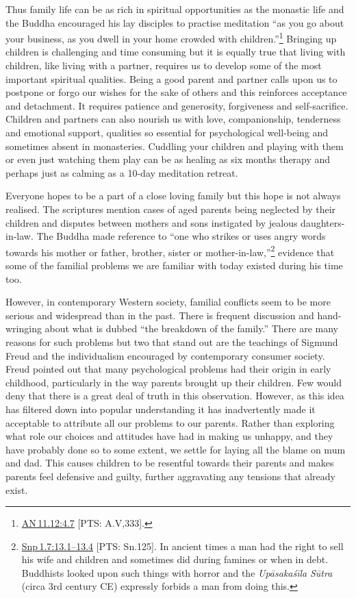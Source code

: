 \documentclass[10pt, openright]{book}
\begin{document}
Thus family life can be as rich in spiritual opportunities as the monastic life and the Buddha encouraged his lay disciples to practise meditation “as you go about your business, as you dwell in your home crowded with children.”\footnote {\href{https://suttacentral.net/an11.12/en/sujato\#4.7}{AN 11.12:4.7} [PTS: A.V,333].} Bringing up children is challenging and time consuming but it is equally true that living with children, like living with a partner, requires us to develop some of the most important spiritual qualities. Being a good parent and partner calls upon us to postpone or forgo our wishes for the sake of others and this reinforces acceptance and detachment. It requires patience and generosity, forgiveness and self-sacrifice. Children and partners can also nourish us with love, companionship, tenderness and emotional support, qualities so essential for psychological well-being and sometimes absent in monasteries. Cuddling your children and playing with them or even just watching them play can be as healing as six months therapy and perhaps just as calming as a 10-day meditation retreat.


Everyone hopes to be a part of a close loving family but this hope is not always realised. The scriptures mention cases of aged parents being neglected by their children and disputes between mothers and sons instigated by jealous daughters-in-law. The Buddha made reference to “one who strikes or uses angry words towards his mother or father, brother, sister or mother-in-law,”\footnote {\href{https://suttacentral.net/snp1.7/en/sujato\#13.1}{Snp 1.7:13.1–13.4} [PTS: Sn.125]. In ancient times a man had the right to sell his wife and children and sometimes did during famines or when in debt. Buddhists looked upon such things with horror and the \textit{Upāsakaśīla} \textit{Sūtra} (circa 3rd century CE) expressly forbids a man from doing this.} evidence that some of the familial problems we are familiar with today existed during his time too.


However, in contemporary Western society, familial conflicts seem to be more serious and widespread than in the past. There is frequent discussion and hand-wringing about what is dubbed “the breakdown of the family.” There are many reasons for such problems but two that stand out are the teachings of Sigmund Freud and the individualism encouraged by contemporary consumer society. Freud pointed out that many psychological problems had their origin in early childhood, particularly in the way parents brought up their children. Few would deny that there is a great deal of truth in this observation. However, as this idea has filtered down into popular understanding it has inadvertently made it acceptable to attribute all our problems to our parents. Rather than exploring what role our choices and attitudes have had in making us unhappy, and they have probably done so to some extent, we settle for laying all the blame on mum and dad. This causes children to be resentful towards their parents and makes parents feel defensive and guilty, further aggravating any tensions that already exist.
\end{document}
